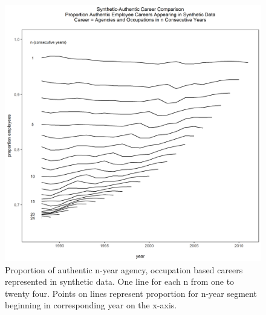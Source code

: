 \documentclass[10pt, letterpaper]{article}
\begin{document}
\begin{spacing}{1.0}
\begin{figure}[h]
    \centering
    \includegraphics[width=5.25in, trim={0 0.25in 0 0.75in}, clip]{CareerProportionsAgencyOcc.png}
    \caption{Proportion of authentic n-year agency, occupation based careers represented in synthetic data.  One line for each n from one to twenty four.  Points on lines represent proportion for n-year segment beginning in corresponding year on the x-axis.}
    \label{figure:CareerProportionsAgencyOcc}
\end{figure}

\clearpage

\end{spacing}

\newpage

\begingroup
\begin{spacing}{1.0}
    \raggedright
    
\end{spacing}
\endgroup
\end{document}
